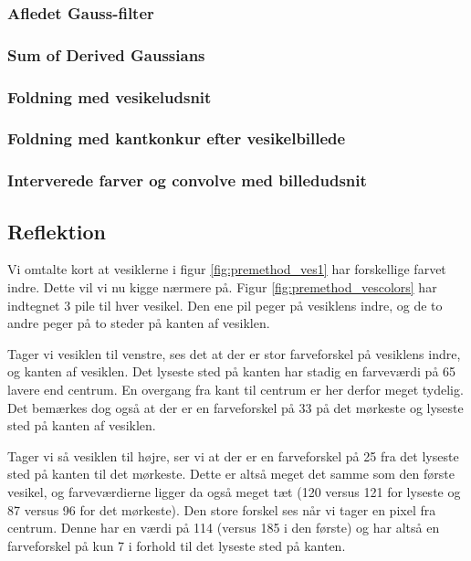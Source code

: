 
\subsubsection{Afledet Gauss-filter}

\subsubsection{Sum of Derived Gaussians}

\subsubsection{Foldning med vesikeludsnit}

\subsubsection{Foldning med kantkonkur efter vesikelbillede}

\subsubsection{Interverede farver og convolve med billedudsnit} 

\subsection{Reflektion}
Vi omtalte kort at vesiklerne i figur \ref{fig:premethod_ves1} har forskellige farvet indre. Dette vil vi nu kigge nærmere på. Figur \ref{fig:premethod_vescolors} har indtegnet 3 pile til hver vesikel. Den ene pil peger på vesiklens indre, og de to andre peger på to steder på kanten af vesiklen. 

Tager vi vesiklen til venstre, ses det at der er stor farveforskel på vesiklens indre, og kanten af vesiklen. Det lyseste sted på kanten har stadig en farveværdi på 65 lavere end centrum. En overgang fra kant til centrum er her derfor meget tydelig. Det bemærkes dog også at der er en farveforskel på 33 på det mørkeste og lyseste sted på kanten af vesiklen. 

Tager vi så vesiklen til højre, ser vi at der er en farveforskel på 25 fra det lyseste sted på kanten til det mørkeste. Dette er altså meget det samme som den første vesikel, og farveværdierne ligger da også meget tæt (120 versus 121 for lyseste og 87 versus 96 for det mørkeste). Den store forskel ses når vi tager en pixel fra centrum. Denne har en værdi på 114 (versus 185 i den første) og har altså en farveforskel på kun 7 i forhold til det lyseste sted på kanten.

